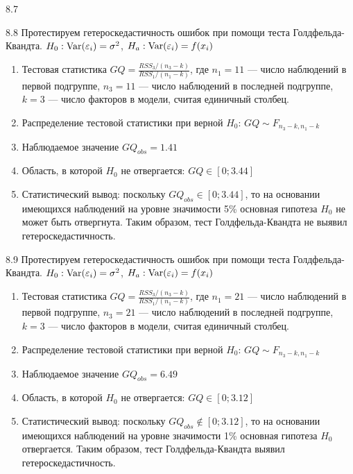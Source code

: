 \protect \hypertarget {soln:8.7}{}
\begin{solution}{{8.7}}
\end{solution}
\protect \hypertarget {soln:8.8}{}
\begin{solution}{{8.8}}
Протестируем гетероскедастичность ошибок при помощи теста Голдфельда-
Квандта. $H_0: \operatorname{Var}(\varepsilon_i)=\sigma^2$, $H_a: \operatorname{Var}(\varepsilon_i)=f(x_i)$

\begin{enumerate}
\item Тестовая статистика $GQ=\frac{RSS_3/(n_3-k)}{RSS_1/(n_1-k)}$, где $n_1=11$ — число наблюдений в первой подгруппе, $n_3=11$ — число наблюдений в
последней подгруппе, $k=3$ — число факторов в модели, считая единичный столбец.
\item Распределение тестовой статистики при верной $H_0$: $GQ\sim F_{n_3-k,n_1-k}$
\item Наблюдаемое значение $GQ_{obs}=1.41$
\item Область, в которой $H_0$ не отвергается: $GQ\in [0;3.44]$
\item Статистический вывод: поскольку $GQ_{obs} \in [0;3.44]$, то на основании имеющихся наблюдений на уровне значимости 5\% основная гипотеза $H_0$ не может быть отвергнута. Таким образом, тест Голдфельда-Квандта не выявил гетероскедастичность.
\end{enumerate}
\end{solution}
\protect \hypertarget {soln:8.9}{}
\begin{solution}{{8.9}}
Протестируем гетероскедастичность ошибок при помощи теста Голдфельда-
Квандта. $H_0: \operatorname{Var}(\varepsilon_i)=\sigma^2$, $H_a: \operatorname{Var}(\varepsilon_i)=f(x_i)$

\begin{enumerate}
\item Тестовая статистика $GQ=\frac{RSS_3/(n_3-k)}{RSS_1/(n_1-k)}$, где $n_1=21$ — число наблюдений в первой подгруппе, $n_3=21$ — число наблюдений в
последней подгруппе, $k=3$ — число факторов в модели, считая единичный столбец.
\item Распределение тестовой статистики при верной $H_0$: $GQ\sim F_{n_3-k,n_1-k}$
\item Наблюдаемое значение $GQ_{obs}=6.49$
\item Область, в которой $H_0$ не отвергается: $GQ\in [0;3.12]$
\item Статистический вывод: поскольку $GQ_{obs} \notin [0;3.12]$, то на основании имеющихся наблюдений на уровне значимости 1\% основная гипотеза $H_0$ отвергается. Таким образом, тест Голдфельда-Квандта выявил гетероскедастичность.
\end{enumerate}
\end{solution}
